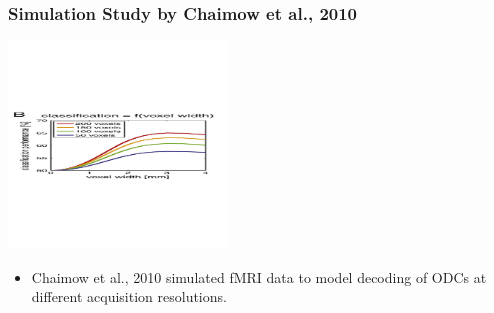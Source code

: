 \documentclass{beamer}
\begin{document}

  \begin{frame}
    \frametitle{Simulation Study by Chaimow et al., 2010}
        \begin{center}
            \includegraphics[height=5.5cm]{../pictures/shmuel_model}
        \end{center}
        \begin{itemize}
         \item Chaimow et al., 2010 simulated fMRI data to model decoding 
         of ODCs at different acquisition resolutions.
        \end{itemize}  
    \end{frame}
\end{document}
